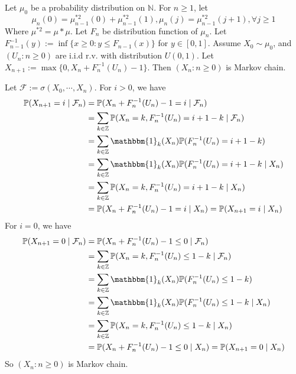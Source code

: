 \documentclass[../main]{subfiles}
\begin{document}
\begin{problem}\label{pro:6}
  Let \(\mu_0\) be a probability distribution on \(\mathbb{N}\).
  For \(n \geq 1\), let
  \[
    \mu_n(0)=\mu^{*2}_{n-1} (0)+\mu^{*2}_{n-1} (1),\mu_n(j)=\mu^{*2}_{n-1} (j+1),\forall j \geq 1
  \]
  Where \(\mu^{*2}=\mu*\mu\).
  Let \(F_n\) be distribution function of \(\mu_n\).
  Let \(F^{-1}_{n-1} (y):=\inf \{x \geq 0:y \leq F_{n-1} (x)\}\) for \(y \in [0,1]\).
  Assume \(X_0 \sim \mu_0\), and \((U_n:n \geq 0)\) are i.i.d r.v. with distribution \(U(0,1)\).
  Let \(X_{n+1} :=\max\{0,X_n +F^{-1}_n (U_n)-1\}\).
  Then \((X_n:n \geq 0)\) is Markov chain.
\end{problem}
\begin{solution}
  Let \(\mathcal{F}:=\sigma(X_0,\cdots,X_n)\).
  For \(i > 0\), we have
  \[
    \begin{aligned}
      \mathbb{P}(X_{n+1}=i \mid \mathcal{F}_n)
       & =\mathbb{P}(X_n+F^{-1}_n(U_n)-1=i \mid \mathcal{F}_n)                              \\
       & =\sum_{k \in \mathbb{Z}}\mathbb{P}(X_n=k,F^{-1}_n(U_n)=i+1-k \mid \mathcal{F}_n)   \\
       & =\sum_{k \in \mathbb{Z}}\mathbbm{1}_k(X_n)\mathbb{P}(F^{-1}_n(U_n)=i+1-k)          \\
       & =\sum_{k \in \mathbb{Z}}\mathbbm{1}_k(X_n)\mathbb{P}(F^{-1}_n(U_n)=i+1-k \mid X_n) \\
       & =\sum_{k \in \mathbb{Z}}\mathbb{P}(X_n=k,F^{-1}_n(U_n)=i+1-k \mid X_n)             \\
       & =\mathbb{P}(X_n+F^{-1}_n(U_n)-1=i \mid X_n) =\mathbb{P}(X_{n+1} =i \mid X_n)       \\
    \end{aligned}
  \]
  For \(i=0\), we have
  \[
    \begin{aligned}
      \mathbb{P}(X_{n+1}=0 \mid \mathcal{F}_n)
       & =\mathbb{P}(X_n+F^{-1}_n(U_n)-1\leq 0 \mid \mathcal{F}_n)                            \\
       & =\sum_{k \in \mathbb{Z}}\mathbb{P}(X_n=k,F^{-1}_n(U_n)\leq 1-k \mid \mathcal{F}_n)   \\
       & =\sum_{k \in \mathbb{Z}}\mathbbm{1}_k(X_n)\mathbb{P}(F^{-1}_n(U_n)\leq 1-k)          \\
       & =\sum_{k \in \mathbb{Z}}\mathbbm{1}_k(X_n)\mathbb{P}(F^{-1}_n(U_n)\leq 1-k \mid X_n) \\
       & =\sum_{k \in \mathbb{Z}}\mathbb{P}(X_n=k,F^{-1}_n(U_n)\leq 1-k \mid X_n)             \\
       & =\mathbb{P}(X_n+F^{-1}_n(U_n)-1\leq 0 \mid X_n) =\mathbb{P}(X_{n+1} = 0 \mid X_n)    \\
    \end{aligned}
  \]
  So \((X_n:n \geq 0)\) is Markov chain.
\end{solution}
\end{document}
